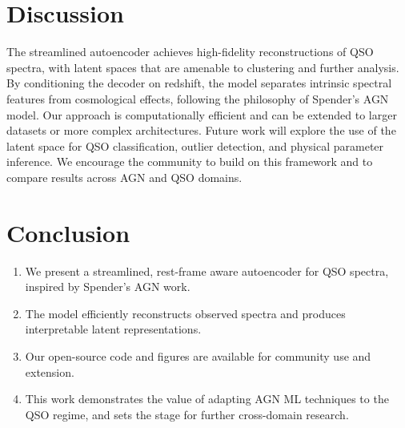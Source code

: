 \documentclass[twocolumn]{aastex631} %
\begin{document}
\section{Discussion}\label{sec:disc}
The streamlined autoencoder achieves high-fidelity reconstructions of QSO spectra, with latent spaces that are amenable to clustering and further analysis. By conditioning the decoder on redshift, the model separates intrinsic spectral features from cosmological effects, following the philosophy of Spender's AGN model. Our approach is computationally efficient and can be extended to larger datasets or more complex architectures. Future work will explore the use of the latent space for QSO classification, outlier detection, and physical parameter inference. We encourage the community to build on this framework and to compare results across AGN and QSO domains.

\section{Conclusion} \label{sec:conc}
\begin{enumerate}
    \item We present a streamlined, rest-frame aware autoencoder for QSO spectra, inspired by Spender's AGN work.
    \item The model efficiently reconstructs observed spectra and produces interpretable latent representations.
    \item Our open-source code and figures are available for community use and extension.
    \item This work demonstrates the value of adapting AGN ML techniques to the QSO regime, and sets the stage for further cross-domain research.
\end{enumerate}


\newpage
{}

\end{document}
